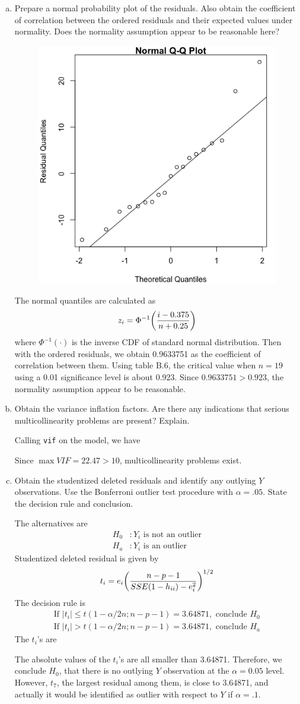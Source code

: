 \documentclass[10pt]{report}
\newcommand{\abs}[1] {\left| #1 \right|}
\DeclarePairedDelimiter\autoparen{(}{)}
\newcommand{\pa}[1]{\autoparen*{#1}}
\begin{document}
\begin{enumerate}[a.]
	\item 
	Prepare a normal probability plot of the residuals. Also obtain the coefficient of correlation between the ordered residuals and their expected values under normality. Does the normality assumption appear to be reasonable here?
	\begin{figure}[H]
		\centering
		\includegraphics[width=.4\linewidth]{p4/20b.png}
	\end{figure}
	The normal quantiles are calculated as
	\[
	z_i = \Phi^{-1} \pa{\frac{i-0.375}{n+0.25}}
	\]
	where $\Phi^{-1}(\cdot)$ is the inverse CDF of standard normal distribution. Then with the ordered residuals, we obtain 0.9633751 as the coefficient of correlation between them. Using table B.6, the critical value when $n=19$ using a 0.01 significance level is about 0.923. Since $0.9633751 > 0.923$, the normality assumption appear to be reasonable.
	
	\item 
	Obtain the variance inflation factors. Are there any indications that serious multicollinearity problems are present? Explain.
	
	Calling \verb|vif| on the model, we have
	
	Since $\max{VIF} = 22.47 > 10$, multicollinearity problems exist.
	
	\item 
	Obtain the studentized deleted residuals and identify any outlying $Y$ observations. Use the Bonferroni outlier test procedure with $\alpha = .05$. State the decision rule and conclusion.
	
	The alternatives are
	\begin{align*}
	H_0 &: \text{$Y_i$ is not an outlier}\\
	H_a &: \text{$Y_i$ is an outlier}
	\end{align*}
	Studentized deleted residual is given by
	\[
	t_i = e_i \pa{\frac{n-p-1}{SSE(1-h_{ii})-e_i^2}}^{1/2}
	\]
	The decision rule is
	\begin{align*}
	\text{If } \abs{t_i} \le t(1-\alpha/2n; n-p-1) = 3.64871, \text{ conclude } H_0\\
	\text{If } \abs{t_i} > t(1-\alpha/2n; n-p-1) = 3.64871, \text{ conclude } H_a
	\end{align*}
	The $t_i$'s are %
	
	The absolute values of the $t_i$'s are all smaller than 3.64871. Therefore, we conclude $H_0$, that there is no outlying $Y$ observation at the $\alpha=0.05$ level. However, $t_7$, the largest residual among them, is close to 3.64871, and actually it would be identified as outlier with respect to $Y$ if $\alpha = .1$.
	

\end{enumerate}
\end{document}
